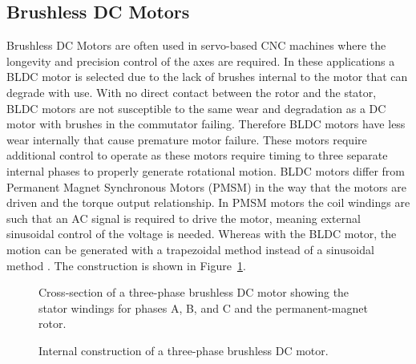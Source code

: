 \subsection{Brushless DC Motors}\label{brushlessMotors}
Brushless DC Motors are often used in servo-based CNC machines where the longevity and precision control of the axes are required. In these applications a BLDC motor is selected due to the lack of brushes internal to the motor that can degrade with use. With no direct contact between the rotor and the stator, BLDC motors are not susceptible to the same wear and degradation as a DC motor with brushes in the commutator failing. Therefore BLDC motors have less wear internally that cause premature motor failure. These motors require additional control to operate as these motors require timing to three separate internal phases to properly generate rotational motion. BLDC motors differ from Permanent Magnet Synchronous Motors (PMSM) in the way that the motors are driven and the torque output relationship. In PMSM motors the coil windings are such that an AC signal is required to drive the motor, meaning external sinusoidal control of the voltage is needed. Whereas with the BLDC motor, the motion can be generated with a trapezoidal method instead of a sinusoidal method \cite{binfet_implementation_2026,nilsson_universal_2013}. The construction is shown in Figure~\ref{fig:bldc_motor}. 

\begin{figure}[htbp]
	\centering
		{Cross-section of a three-phase brushless DC motor showing the stator windings for phases A, B, and C and the permanent-magnet rotor.}
	\caption[Brushless DC motor construction]{Internal construction of a three-phase brushless DC motor.}
	\label{fig:bldc_motor}
\end{figure}

